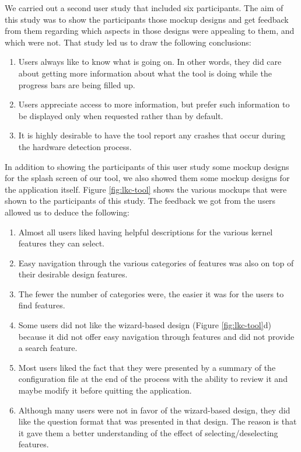 \documentclass{chi2009}
\begin{document}
We carried out a second user study that included six participants. The aim of this study was to show the participants those mockup designs and get feedback from
them regarding which aspects in those designs were appealing to them, and which were not. That study led us to draw the following conclusions:
\begin{enumerate}
 \item Users always like to know what is going on. In other words, they did care about getting more information about what the tool is doing while the progress
bars are being filled up.
 \item Users appreciate access to more information, but prefer such information to be displayed only when requested rather than by default.
 \item It is highly desirable to have the tool report any crashes that occur during the hardware detection process.
\end{enumerate}

In addition to showing the participants of this user study some mockup designs for the splash screen of our tool, we also showed them some mockup designs
for the application itself. Figure \ref{fig:lkc-tool} shows the various mockups that were shown to the participants of this study. The feedback we got from the
users allowed us to deduce the following:
\begin{enumerate}
 \item Almost all users liked having helpful descriptions for the various kernel features they can select.
 \item Easy navigation through the various categories of features was also on top of their desirable design features.
 \item The fewer the number of categories were, the easier it was for the users to find features.
 \item Some users did not like the wizard-based design (Figure \ref{fig:lkc-tool}d) because it did not offer easy navigation through features and did not
provide a search feature.
 \item Most users liked the fact that they were presented by a summary of the configuration file at the end of the process with the ability to review it and
maybe modify it before quitting the application.
 \item Although many users were not in favor of the wizard-based design, they did like the question format that was presented in that design. The reason is
that it gave them a better understanding of the effect of selecting/deselecting features.
\end{enumerate}
\end{document}

